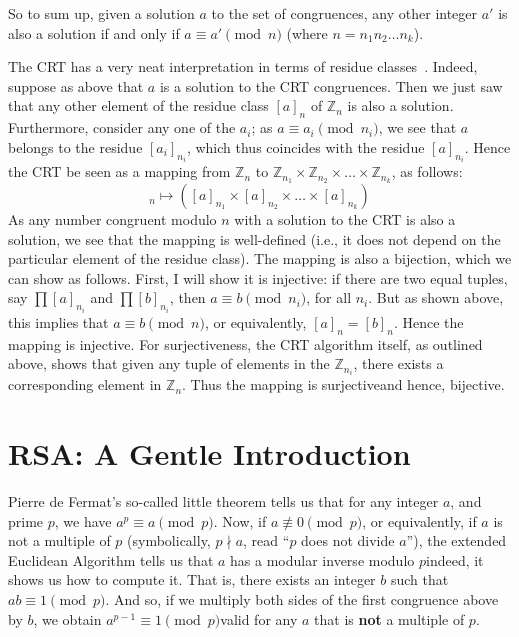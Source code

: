   So to sum up, given a solution $a$ to the set of congruences, any other integer $a'$ is also a solution if and only if $a \equiv a' \pmod{n}$ (where $n = n_1n_2\dots n_k$).

  \medskip

  The CRT has a very neat interpretation in terms of residue classes~\cite[]{Shoup:2009}. Indeed, suppose as above that $a$ is a solution to the CRT congruences. Then we just saw that any other element of the residue class $[a]_n$ of $\mathbb{Z}_n$ is also a solution. Furthermore, consider any one of the $a_i$; as $a \equiv a_i \pmod{n_i}$, we see that $a$ belongs to the residue $[a_i]_{n_i}$, which thus coincides with the residue $[a]_{n_i}$. Hence the CRT be seen as a mapping from $\mathbb{Z}_{n}$ to $\mathbb{Z}_{n_1} \times \mathbb{Z}_{n_2} \times\dots\times \mathbb{Z}_{n_k}$, as follows:
  \begin{equation}
    [a]_n \mapsto ([a]_{n_1}\times [a]_{n_2} \times\dots\times [a]_{n_k})
  \end{equation}
  As any number congruent modulo $n$ with a solution to the CRT is also a solution, we see that the mapping is well-defined (i.e., it does not depend on the particular element of the residue class). The mapping is also a bijection, which we can show as follows. First, I will show it is injective: if there are two equal tuples, say $\prod [a]_{n_i}$ and $\prod [b]_{n_i}$, then $a \equiv b \pmod{n_i}$, for all $n_i$. But as shown above, this implies that $a \equiv b \pmod {n}$, or equivalently, $[a]_n = [b]_n$. Hence the mapping is injective. For surjectiveness, the CRT algorithm itself, as outlined above, shows that given any tuple of elements in the $\mathbb{Z}_{n_i}$, there exists a corresponding element in $\mathbb{Z}_n$. Thus the mapping is surjective\emd and hence, bijective.

\section{RSA: A Gentle Introduction}
  \label{sec:rsa_gentle_intro}
  Pierre de Fermat's so-called little theorem tells us that for any integer $a$, and prime $p$, we have $a^p \equiv a \pmod{p}$. Now, if $a\not\equiv 0 \pmod{p}$, or equivalently, if $a$ is not a multiple of $p$ (symbolically, $p\nmid a$, read ``$p$ does not divide $a$''), the extended Euclidean Algorithm tells us that $a$ has a modular inverse modulo $p$\emd indeed, it shows us how to compute it. That is, there exists an integer $b$ such that $ab \equiv 1 \pmod{p}$. And so, if we multiply both sides of the first congruence above by $b$, we obtain $a^{p-1} \equiv 1 \pmod{p}$\emd valid for any $a$ that is \textbf{not} a multiple of $p$.

